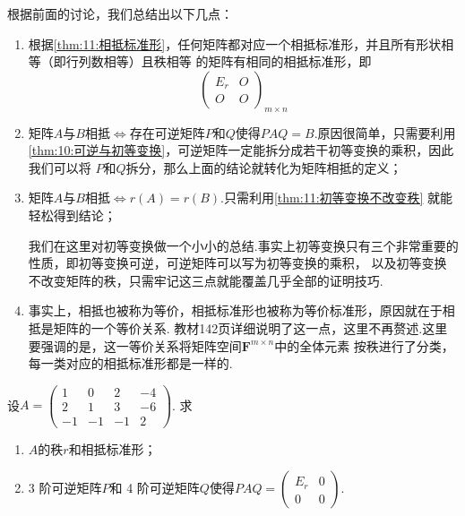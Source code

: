根据前面的讨论，我们总结出以下几点：
\begin{enumerate}
    \item 根据\autoref{thm:11:相抵标准形}，任何矩阵都对应一个相抵标准形，并且所有形状相等（即行列数相等）且秩相等
    的矩阵有相同的相抵标准形，即\[\begin{pmatrix}
        E_r & O \\ O & O
    \end{pmatrix}_{m\times n}\]
    \item 矩阵$A$与$B$相抵$\iff$存在可逆矩阵$P$和$Q$使得$PAQ=B$.原因很简单，只需要利用
    \autoref{thm:10:可逆与初等变换}，可逆矩阵一定能拆分成若干初等变换的乘积，因此我们可以将
    $P$和$Q$拆分，那么上面的结论就转化为矩阵相抵的定义；
    \item 矩阵$A$与$B$相抵$\iff r(A)=r(B)$.只需利用\autoref{thm:11:初等变换不改变秩} 就能轻松得到结论；

    我们在这里对初等变换做一个小小的总结.事实上初等变换只有三个非常重要的性质，即初等变换可逆，可逆矩阵可以写为初等变换的乘积，
    以及初等变换不改变矩阵的秩，只需牢记这三点就能覆盖几乎全部的证明技巧.

    \item 事实上，相抵也被称为等价，相抵标准形也被称为等价标准形，原因就在于相抵是矩阵的一个等价关系.
    教材142页详细说明了这一点，这里不再赘述.这里要强调的是，这一等价关系将矩阵空间$\mathbf{F}^{m\times n}$中的全体元素
    按秩进行了分类，每一类对应的相抵标准形都是一样的.
\end{enumerate}

\begin{example}
    设$A=\begin{pmatrix}
        1 & 0 & 2 & -4 \\ 2 & 1 & 3 & -6 \\ -1 & -1 & -1 & 2
    \end{pmatrix}$. 求
    \begin{enumerate}
        \item $A$的秩$r$和相抵标准形；

        \item 3 阶可逆矩阵$P$和 4 阶可逆矩阵$Q$使得$PAQ=\begin{pmatrix}
            E_r & 0 \\ 0 & 0
        \end{pmatrix}$.
    \end{enumerate}
\end{example}
\begin{solution}

\end{solution}

